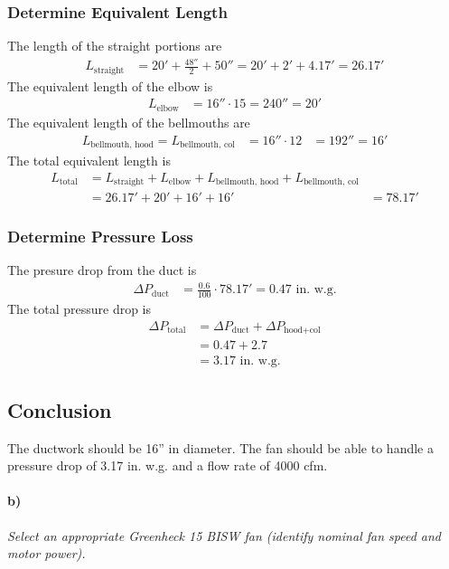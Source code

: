 \subsubsection{Determine Equivalent Length}
The length of the straight portions are
\begin{align*}
    L_{\text{straight}} &= 20' + \frac{48''}{2} + 50'' = 20' + 2' + 4.17' = 26.17'
\end{align*}
The equivalent length of the elbow is
\begin{align*}
    L_{\text{elbow}} &= 16'' \cdot 15 = 240'' = 20'
\end{align*}
The equivalent length of the bellmouths are
\begin{align*}
    L_{\text{bellmouth, hood}} = L_{\text{bellmouth, col}}  &= 16'' \cdot 12
   &= 192'' = 16'
\end{align*}
The total equivalent length is
\begin{align*}
    L_{\text{total}} &= L_{\text{straight}} + L_{\text{elbow}} + L_{\text{bellmouth, hood}} + L_{\text{bellmouth, col}} \\
    &= 26.17' + 20' + 16' + 16' 
    &= 78.17'
\end{align*}

\subsubsection{Determine Pressure Loss}
The presure drop from the duct is 
\begin{align*}
    \Delta P_{\text{duct}} &= \frac{0.6}{100} \cdot 78.17' = 0.47 \text{ in. w.g.}
\end{align*}
The total pressure drop is
\begin{align*}
    \Delta P_{\text{total}} &= \Delta P_{\text{duct}} + \Delta P_{\text{hood+col}} \\
    &= 0.47 + 2.7 \\
    &= 3.17 \text{ in. w.g.}
\end{align*}

\subsection{Conclusion}
The ductwork should be 16'' in diameter. The fan should be able to handle a pressure drop of 3.17 in. w.g. and a flow rate of 4000 cfm.

\paragraph{b)} \textit{Select an appropriate Greenheck 15 BISW fan (identify nominal fan speed and motor power).}
\setcounter{subsection}{0}
